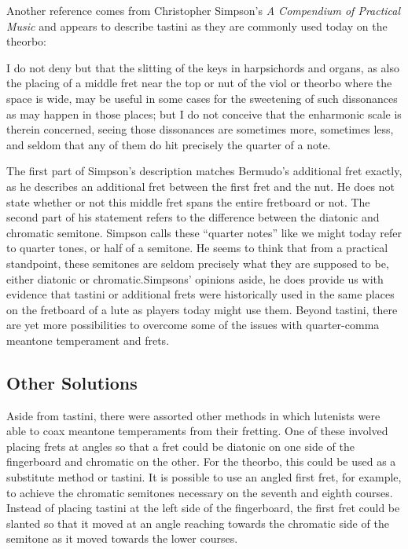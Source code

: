 Another reference comes from Christopher Simpson's \textit{A Compendium of Practical
Music} and appears to describe tastini as they are commonly used today on the theorbo:
\begin{blocks}
I do not deny but that the slitting of the keys in harpsichords and organs, as also the
placing of a middle fret near the top or nut of the viol or theorbo where the space is
wide, may be useful in some cases for the sweetening of such dissonances as may happen
in those places; but I do not conceive that the enharmonic scale is therein concerned,
seeing those dissonances are sometimes more, sometimes less, and seldom that any of them
do hit precisely the quarter of a note. \autocite[51]{CS:1}
\end{blocks}
The first part of Simpson's description matches Bermudo's additional fret exactly, as
he describes an additional fret between the first fret and the nut.  He does not state
whether or not this middle fret spans the entire fretboard or not.  The second part of
his statement refers to the difference between the diatonic and chromatic semitone.
Simpson calls these ``quarter notes'' like we might today refer to quarter tones, or
half of a semitone.  He seems to think that from a practical standpoint, these
semitones are seldom precisely what they are supposed to be, either diatonic or
chromatic.Simpsons' opinions aside, he does provide us with evidence that tastini or
additional frets were historically used in the same places on the fretboard of a lute
as players today might use them.  Beyond tastini, there are yet more possibilities to
overcome some of the issues with quarter-comma meantone temperament and frets.

\subsection{Other Solutions}

Aside from tastini, there were assorted other methods in which lutenists were able to
coax meantone temperaments from their fretting.  One of these involved placing frets at
angles so that a fret could be diatonic on one side of the fingerboard and chromatic on
the other.  For the theorbo, this could be used as a substitute method or tastini.  It
is possible to use an angled first fret, for example, to achieve the chromatic
semitones necessary on the seventh and eighth courses.  Instead of placing tastini at
the left side of the fingerboard, the first fret could be slanted so that it moved at
an angle reaching towards the chromatic side of the semitone as it moved towards the
lower courses.

